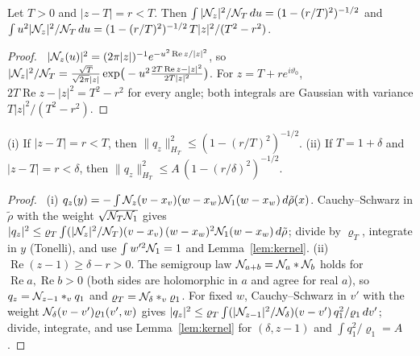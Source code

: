 \begin{lemma}\label{lem:kernel}
Let $T>0$ and $|z-T|=r<T$. Then $\int|\mathcal N_z|^2/\mathcal N_T\,du=(1-(r/T)^2)^{-1/2}$ and $\int u^2|\mathcal N_z|^2/\mathcal N_T\,du=(1-(r/T)^2)^{-1/2}\,T|z|^2/(T^2-r^2)$.
\end{lemma}
\begin{proof}\proofst\
$|\mathcal N_z(u)|^2=(2\pi|z|)^{-1}e^{-u^2\operatorname{Re}z/|z|^2}$, so $|\mathcal N_z|^2/\mathcal N_T=\frac{\sqrt T}{\sqrt{2\pi}|z|}\exp\!\big(-u^2\frac{2T\operatorname{Re}z-|z|^2}{2T|z|^2}\big)$.
For $z=T+re^{i\vartheta_0}$, $2T\operatorname{Re}z-|z|^2=T^2-r^2$ for every angle; both integrals are Gaussian with variance $T|z|^2/(T^2-r^2)$.
\end{proof}

\begin{lemma}\label{lem:circles}
(i) If $|z-T|=r<T$, then $\|q_z\|^2_{H_T}\le(1-(r/T)^2)^{-1/2}$.
(ii) If $T=1+\delta$ and $|z-T|=r<\delta$, then $\|q_z\|^2_{H_T}\le A\,(1-(r/\delta)^2)^{-1/2}$.
\end{lemma}
\begin{proof}\proofst\
(i) $q_z(y)=-\int\mathcal N_z(v-x_v)(w-x_w)\mathcal N_1(w-x_w)\,d\tilde\rho(x)$.
Cauchy--Schwarz in $\tilde\rho$ with the weight $\sqrt{\mathcal N_T\mathcal N_1}$ gives $|q_z|^2\le\varrho_T\int(|\mathcal N_z|^2/\mathcal N_T)(v-x_v)\,(w-x_w)^2\mathcal N_1(w-x_w)\,d\tilde\rho$; divide by $\varrho_T$, integrate in $y$ (Tonelli), and use $\int w'^2\mathcal N_1=1$ and Lemma~\ref{lem:kernel}.
(ii) $\operatorname{Re}(z-1)\ge\delta-r>0$.
The semigroup law $\mathcal N_{a+b}=\mathcal N_a*\mathcal N_b$ holds for $\operatorname{Re}a,\operatorname{Re}b>0$ (both sides are holomorphic in $a$ and agree for real $a$), so $q_z=\mathcal N_{z-1}*_vq_1$ and $\varrho_T=\mathcal N_\delta*_v\varrho_1$.
For fixed $w$, Cauchy--Schwarz in $v'$ with the weight $\mathcal N_\delta(v-v')\varrho_1(v',w)$ gives $|q_z|^2\le\varrho_T\int(|\mathcal N_{z-1}|^2/\mathcal N_\delta)(v-v')\,q_1^2/\varrho_1\,dv'$; divide, integrate, and use Lemma~\ref{lem:kernel} for $(\delta,z-1)$ and $\int q_1^2/\varrho_1=A$.
\end{proof}

